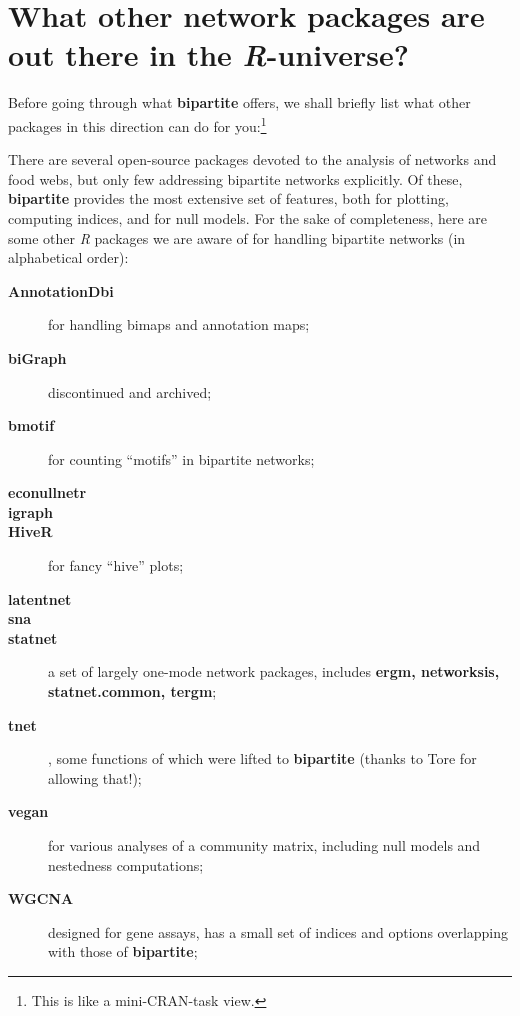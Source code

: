\documentclass[a4paper, 11pt]{article}
\newcommand{\package}[1]{\textbf{#1}}
\newcommand{\proglang}[1]{\textsl{#1}}
\begin{document}
\section{What other network packages are out there in the \proglang{R}-universe?}
Before going through what \package{bipartite} offers, we shall briefly list what other packages in this direction can do for you:\footnote{ This is like a mini-CRAN-task view.}

There are several open-source packages devoted to the analysis of networks and food webs, but only few addressing bipartite networks explicitly. Of these, \package{bipartite} provides the most extensive set of features, both for plotting, computing indices, and for null models. For the sake of completeness, here are some other \proglang{R} packages we are aware of for handling bipartite networks (in alphabetical order):
\begin{description}
\item[\package{AnnotationDbi}] for handling bimaps and annotation maps;
\item[\package{biGraph}] discontinued and archived;
\item[\package{bmotif}] for counting ``motifs'' in bipartite networks; 
\item[\package{econullnetr}]
\item[\package{igraph}]
\item[\package{HiveR}] for fancy ``hive'' plots;
\item[\package{latentnet}] 
\item[\package{sna}]
\item[\package{statnet}] a set of largely one-mode network packages, includes \package{ergm, networksis, statnet.common, tergm};
\item[\package{tnet}], some functions of which were lifted to \package{bipartite} (thanks to Tore for allowing that!);
\item[\package{vegan}] for various analyses of a community matrix, including null models and nestedness computations;
\item[\package{WGCNA}] designed for gene assays, has a small set of indices and options overlapping with those of \package{bipartite};
\end{description}
\end{document}
